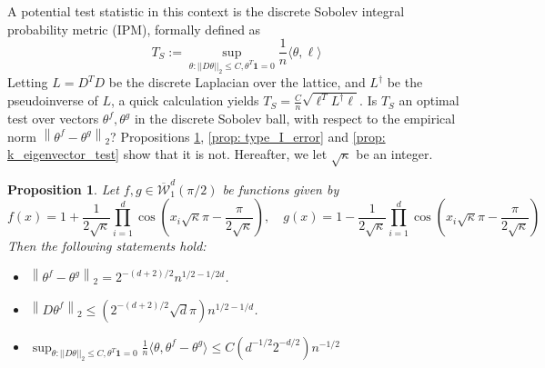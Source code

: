 \documentclass{article}
\newcommand{\norm}[1]{\left\lVert#1\right\rVert}
\newcommand{\dotp}[2]{\langle #1, #2 \rangle}
\newcommand{\1}{\mathbb{I}}
\newcommand{\Linv}{L^{\dagger}}
\theoremstyle{alden}
\theoremstyle{aldenthm}
\newtheorem{proposition}{Proposition}
\theoremstyle{definition}
\theoremstyle{remark}
\begin{document}
A potential test statistic in this context is the discrete Sobolev integral probability metric (IPM), formally defined as
\begin{equation*}
T_{S} := \sup_{\theta: ||D\theta||_2 \leq C, \theta^T \mathbf{1} = 0} 
\frac{1}{n}\dotp{\theta}{\ell}
\end{equation*}
Letting $L = D^T D$ be the discrete Laplacian over the lattice, and $\Linv$ be the pseudoinverse of $L$, a quick calculation yields $T_S = \frac{C}{n} \sqrt{\ell^T \Linv \ell}$. Is $T_{S}$ an optimal test over vectors $\theta^f, \theta^g$ in the discrete Sobolev ball, with respect to the empirical norm $\norm{\theta^f - \theta^g}_2$? Propositions \ref{prop: suboptimal_IPM}, \ref{prop: type_I_error} and \ref{prop: k_eigenvector_test} show that it is not. Hereafter, we let $\sqrt{\kappa}$ be an integer.
\begin{proposition}
	\label{prop: suboptimal_IPM}
	Let $f,g \in \overline{\mathcal{W}}_1^d(\pi/2)$ be functions given by
	\begin{equation*}
	f(x) = 1 + \frac{1}{2\sqrt{\kappa}}\prod_{i = 1}^{d} \cos\left(x_i \sqrt{\kappa} \pi - \frac{\pi}{2 \sqrt{\kappa}}\right), \quad g(x) =  1 - \frac{1}{2\sqrt{\kappa}}\prod_{i = 1}^{d} \cos\left(x_i \sqrt{\kappa} \pi - \frac{\pi}{2 \sqrt{\kappa}}\right)
	\end{equation*}
	Then the following statements hold:
	\begin{itemize}
		\item $\norm{\theta^f - \theta^g}_2 = 2^{-(d+2)/2} n^{1/2 - 1/2d}$.
		\item $\norm{D \theta^f}_2 \leq (2^{-(d+2)/2}\sqrt{d}\pi) n^{1/2 - 1/d}$.
		\item $\sup_{\theta: ||D\theta||_2 \leq C, \theta^T \mathbf{1} = 0} 
		\frac{1}{n}\dotp{\theta}{\theta^f - \theta^g} \leq C(d^{-1/2} 2^{-d/2}) n^{-1/2}$
	\end{itemize}
\end{proposition}
\end{document}
